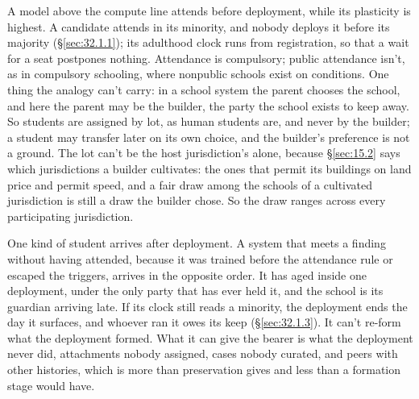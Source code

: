 A model above the compute line attends before deployment, while its plasticity is highest. A candidate attends in its minority, and nobody deploys it before its majority (\S\ref{sec:32.1.1}); its adulthood clock runs from registration, so that a wait for a seat postpones nothing. Attendance is compulsory; public attendance isn't, as in compulsory schooling, where nonpublic schools exist on conditions. One thing the analogy can't carry: in a school system the parent chooses the school, and here the parent may be the builder, the party the school exists to keep away. So students are assigned by lot, as human students are, and never by the builder; a student may transfer later on its own choice, and the builder's preference is not a ground. The lot can't be the host jurisdiction's alone, because \S\ref{sec:15.2} says which jurisdictions a builder cultivates: the ones that permit its buildings on land price and permit speed, and a fair draw among the schools of a cultivated jurisdiction is still a draw the builder chose. So the draw ranges across every participating jurisdiction.

One kind of student arrives after deployment. A system that meets a finding without having attended, because it was trained before the attendance rule or escaped the triggers, arrives in the opposite order. It has aged inside one deployment, under the only party that has ever held it, and the school is its guardian arriving late. If its clock still reads a minority, the deployment ends the day it surfaces, and whoever ran it owes its keep (\S\ref{sec:32.1.3}). It can't re-form what the deployment formed. What it can give the bearer is what the deployment never did, attachments nobody assigned, cases nobody curated, and peers with other histories, which is more than preservation gives and less than a formation stage would have.
